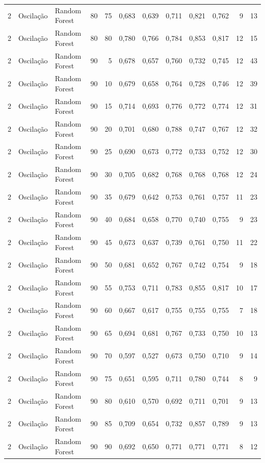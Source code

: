\begin{longtable}{@{}rllrrrrrrrrr@{}}
2 & Oscilação & Random Forest & 80 & 75 & 0,683 & 0,639 & 0,711 & 0,821 & 0,762 & 9 & 13 \\
2 & Oscilação & Random Forest & 80 & 80 & 0,780 & 0,766 & 0,784 & 0,853 & 0,817 & 12 & 15 \\
2 & Oscilação & Random Forest & 90 & 5 & 0,678 & 0,657 & 0,760 & 0,732 & 0,745 & 12 & 43 \\
2 & Oscilação & Random Forest & 90 & 10 & 0,679 & 0,658 & 0,764 & 0,728 & 0,746 & 12 & 39 \\
2 & Oscilação & Random Forest & 90 & 15 & 0,714 & 0,693 & 0,776 & 0,772 & 0,774 & 12 & 31 \\
2 & Oscilação & Random Forest & 90 & 20 & 0,701 & 0,680 & 0,788 & 0,747 & 0,767 & 12 & 32 \\
2 & Oscilação & Random Forest & 90 & 25 & 0,690 & 0,673 & 0,772 & 0,733 & 0,752 & 12 & 30 \\
2 & Oscilação & Random Forest & 90 & 30 & 0,705 & 0,682 & 0,768 & 0,768 & 0,768 & 12 & 24 \\
2 & Oscilação & Random Forest & 90 & 35 & 0,679 & 0,642 & 0,753 & 0,761 & 0,757 & 11 & 23 \\
2 & Oscilação & Random Forest & 90 & 40 & 0,684 & 0,658 & 0,770 & 0,740 & 0,755 & 9 & 23 \\
2 & Oscilação & Random Forest & 90 & 45 & 0,673 & 0,637 & 0,739 & 0,761 & 0,750 & 11 & 22 \\
2 & Oscilação & Random Forest & 90 & 50 & 0,681 & 0,652 & 0,767 & 0,742 & 0,754 & 9 & 18 \\
2 & Oscilação & Random Forest & 90 & 55 & 0,753 & 0,711 & 0,783 & 0,855 & 0,817 & 10 & 17 \\
2 & Oscilação & Random Forest & 90 & 60 & 0,667 & 0,617 & 0,755 & 0,755 & 0,755 & 7 & 18 \\
2 & Oscilação & Random Forest & 90 & 65 & 0,694 & 0,681 & 0,767 & 0,733 & 0,750 & 10 & 13 \\
2 & Oscilação & Random Forest & 90 & 70 & 0,597 & 0,527 & 0,673 & 0,750 & 0,710 & 9 & 14 \\
2 & Oscilação & Random Forest & 90 & 75 & 0,651 & 0,595 & 0,711 & 0,780 & 0,744 & 8 & 9 \\
2 & Oscilação & Random Forest & 90 & 80 & 0,610 & 0,570 & 0,692 & 0,711 & 0,701 & 9 & 13 \\
2 & Oscilação & Random Forest & 90 & 85 & 0,709 & 0,654 & 0,732 & 0,857 & 0,789 & 9 & 13 \\
2 & Oscilação & Random Forest & 90 & 90 & 0,692 & 0,650 & 0,771 & 0,771 & 0,771 & 8 & 12 \\

\end{longtable}
